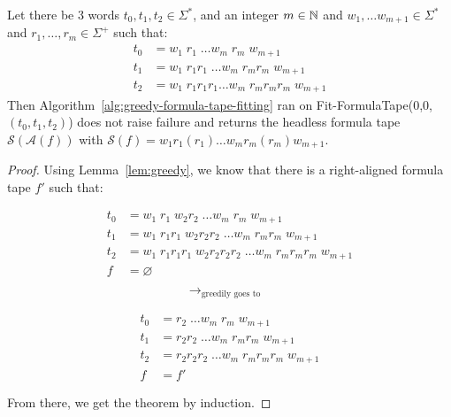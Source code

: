 \begin{theorem}\label{th:greedy}
    Let there be 3 words $t_0, t_1, t_2 \in \Sigma^*$, and an integer $m\in\mathbb{N}$ and $w_1, \dots w_{m+1} \in \Sigma^*$ and $r_1, \dots, r_m \in\Sigma^+$ such that:
    \begin{align*}
        t_0 & = w_1\; r_1\; \dots w_m\; r_m\; w_{m+1}               \\
        t_1 & = w_1\; r_1r_1\; \dots w_m\; r_m r_m\; w_{m+1}        \\
        t_2 & = w_1\; r_1 r_1 r_1 \dots w_m\; r_m r_m r_m\; w_{m+1}
    \end{align*}
    Then Algorithm~\ref{alg:greedy-formula-tape-fitting} ran on {\sc Fit-FormulaTape}(0,0,$(t_0,t_1,t_2)$) does not raise failure and returns the headless formula tape $\mathcal{S}(\mathcal{A}(f))$ with $\mathcal{S}(f) = w_1 r_1 (r_1) \dots w_m r_m (r_m) w_{m+1}$.

\end{theorem}
\begin{proof}


    Using Lemma~\ref{lem:greedy}, we know that there is a right-aligned formula tape $f'$ such that:
    \setlength{\columnsep}{-1.9cm}
    \begin{multicols}{3}
        \noindent
        \begin{align*}
            t_0 & = w_1\; r_1\; w_2 r_2\; \dots w_m\; r_m\; w_{m+1}                         \\
            t_1 & = w_1\; r_1r_1\; w_2 r_2 r_2\; \dots w_m\; r_m r_m\; w_{m+1}              \\
            t_2 & = w_1\; r_1 r_1 r_1\; w_2 r_2 r_2 r_2\; \dots w_m\; r_m r_m r_m\; w_{m+1} \\
            f   & = \varnothing
        \end{align*}
        \begin{align*}
             &                            \\
            \to_{\text{greedily goes to}} \\
             &                            \\
             &
        \end{align*}
        \begin{align*}
            t_0 & = r_2\; \dots w_m\; r_m\; w_{m+1}                 \\
            t_1 & = r_2 r_2\; \dots w_m\; r_m r_m\; w_{m+1}         \\
            t_2 & = r_2 r_2 r_2\; \dots w_m\; r_m r_m r_m\; w_{m+1} \\
            f   & = f'
        \end{align*}
    \end{multicols}
    From there, we get the theorem by induction.





\end{proof}
